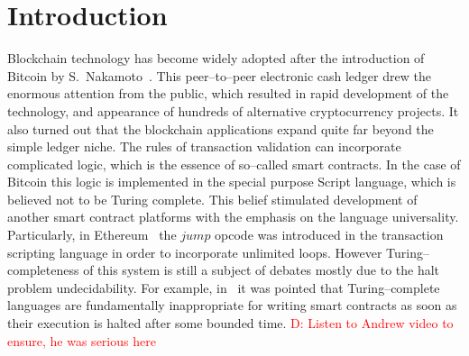 \documentclass[runningheads]{llncs}
\newcommand{\dnote}[1]{\textcolor{red}{D: {#1}}}
\begin{document}
    \section{Introduction}
    Blockchain technology has become widely adopted after the introduction of
    Bitcoin by S.~Nakamoto~\cite{nakamoto2008bitcoin}. This peer--to--peer
    electronic cash ledger drew the enormous attention from the public, which
    resulted in rapid development of the technology, and appearance of hundreds
    of alternative cryptocurrency projects. It also turned out that the
    blockchain applications expand quite far beyond the simple ledger niche. The
    rules of transaction validation can incorporate complicated logic, which is
    the essence of so--called smart contracts. In the case of Bitcoin this logic
    is implemented in the special purpose Script language, which is believed not
    to be Turing complete. This belief stimulated development of another smart
    contract platforms with the emphasis on the language
    universality. Particularly, in Ethereum~\cite{buterin2014next} the $jump$ opcode was introduced
    in the transaction scripting language in order to incorporate
    unlimited loops. However Turing--completeness of this system is still a
    subject of debates mostly due to the halt problem undecidability.
    For example, in~\cite{miller2016ethereum} it was pointed
    that Turing--complete languages are fundamentally inappropriate for writing
    smart contracts as soon as their execution is halted after some bounded time.
    \dnote{Listen to Andrew video to ensure, he was serious here}
\end{document}
